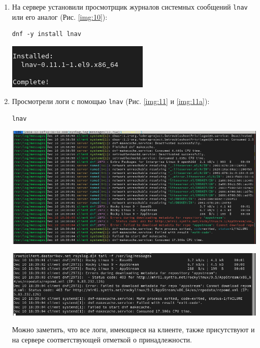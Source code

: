 \begin{enumerate}
\item На сервере установили просмотрщик журналов системных сообщений {\tt lnav} или его аналог (Рис. \ref{img:10}):
    \begin{verbatim}
dnf -y install lnav
    \end{verbatim}

\begin{center}
    \centering
    \includegraphics[width=\textwidth]{../images/image10.png}
    \label{img:10}
\end{center}

\item Просмотрели логи с помощью {\tt lnav} (Рис. \ref{img:11} и \ref{img:11a}):
    \begin{verbatim}
lnav
    \end{verbatim}

\begin{center}
    \centering
    \includegraphics[width=\textwidth]{../images/image11.png}
    \label{img:11}
\end{center}

\begin{center}
    \centering
    \includegraphics[width=\textwidth]{../images/image11a.png}
    \label{img:11a}
\end{center}

Можно заметить, что все логи, имеющиеся на клиенте, также присутствуют и на сервере соответствующей отметкой о принадлежности.
\end{enumerate}

